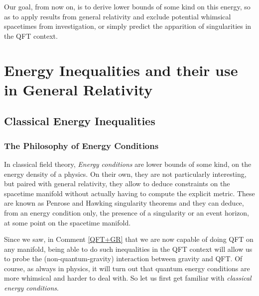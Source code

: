 \documentclass[a4paper,11pt]{article}
\numberwithin{equation}{section}
\theoremstyle{definition}
\begin{document}
    Our goal, from now on, is to derive lower bounds of some kind on this energy, so as to apply results from general relativity and exclude potential whimsical spacetimes from investigation, or simply predict the apparition of singularities in the QFT context.
    
\section{Energy Inequalities and their use in General Relativity}
\subsection{Classical Energy Inequalities}
\subsubsection{The Philosophy of Energy Conditions}
In classical field theory, \emph{Energy conditions} are lower bounds of some kind, on the energy density of a physics. On their own, they are not particularly interesting, but paired with general relativity, they allow to deduce constraints on the spacetime manifold without actually having to compute the explicit metric. These are known as Penrose and Hawking singularity theorems \cite{SingTheo} and they can deduce, from an energy condition only, the presence of a singularity or an event horizon, at some point on the spacetime manifold. 

Since we saw, in Comment \ref{QFT+GR} that we are now capable of doing QFT on any manifold, being able to do such inequalities in the QFT context will allow us to probe the (non-quantum-gravity) interaction between gravity and QFT. Of course, as always in physics, it will turn out that quantum energy conditions are more whimsical and harder to deal with. So let us first get familiar with \emph{classical energy conditions}.
\end{document}
